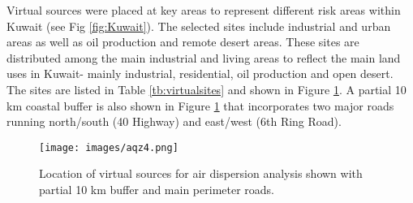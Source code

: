 Virtual sources were placed at key areas to represent different risk areas within Kuwait (see Fig \ref{fig:Kuwait}).  The selected sites include industrial and urban areas as well as oil production and remote desert areas. These sites are distributed among the main industrial and living areas to reflect the main land uses in Kuwait- mainly industrial, residential, oil production and open desert.  The sites are listed in Table \ref{tb:virtualsites} and shown in Figure \ref{fig:virtual-locations}. A partial 10 km coastal buffer is also shown in Figure \ref{fig:virtual-locations} that incorporates two major roads running north/south (40 Highway) and east/west (6th Ring Road).
%
\begin{table}[H]
\centering
\caption{Virtual Site locations.}
\label{tb:virtualsites}
\end{table}
%
%
\begin{figure}[H]
\texttt{[image: images/aqz4.png]} 
\caption[Location of virtual sources]{Location of virtual sources for air dispersion analysis shown with partial 10 km buffer and main perimeter roads.}
\label{fig:virtual-locations}
\end{figure}
%

